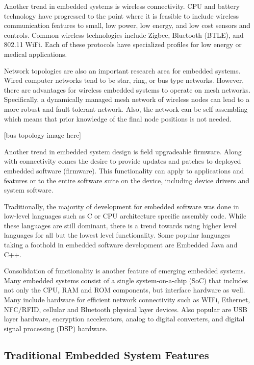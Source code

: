 \documentclass[final,conference,10pt]{IEEEtran}
\begin{document}
Another trend in embedded systems is wireless connectivity.  CPU and battery technology have progressed to the point where it is feasible to include wireless communication features to small, low power, low energy, and low cost sensors and controls.  Common wireless technologies include Zigbee, Bluetooth (BTLE), and 802.11 WiFi.  Each of these protocols have specialized profiles for low energy or medical applications.  

Network topologies are also an important research area for embedded systems.  Wired computer networks tend to be star, ring, or bus type networks.  However, there are advantages for wireless embedded systems to operate on mesh networks.  Specifically, a dynamically managed mesh network of wireless nodes can lead to a more robust and fault tolerant network.  Also, the network can be self-assembling which means that prior knowledge of the final node positions is not needed. 

[bus topology image here]

Another trend in embedded system design is field upgradeable firmware.  Along with connectivity comes the desire to provide updates and patches to deployed embedded software (firmware).  This functionality can apply to applications and features or to the entire software suite on the device, including device drivers and system software.

Traditionally, the majority of development for embedded software was done in low-level languages such as C or CPU architecture specific assembly code.  While these languages are still dominant, there is a trend towards using higher level languages for all but the lowest level functionality.  Some popular languages taking a foothold in embedded software development are Embedded Java and C++.

Consolidation of functionality is another feature of emerging embedded systems.  Many embedded systems consist of a single system-on-a-chip (SoC) that includes not only the CPU, RAM and ROM components, but interface hardware as well.  Many include hardware for efficient network connectivity such as WIFi, Ethernet, NFC/RFID, cellular and Bluetooth physical layer devices.  Also popular are USB layer hardware, encryption accelerators, analog to digital converters, and digital signal processing (DSP) hardware.

\subsection{Traditional Embedded System Features}
\end{document}
